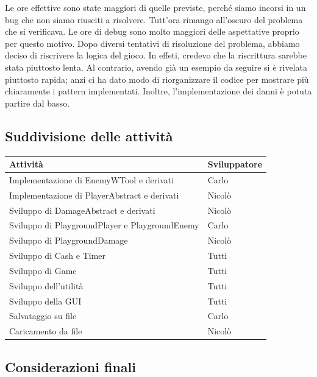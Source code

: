 \documentclass[11pt]{article}
\begin{document}
Le ore effettive sono state maggiori di quelle previste, perché siamo incorsi in
un bug che non siamo riusciti a risolvere. Tutt'ora rimango all'oscuro del
problema che si verificava. Le ore di debug sono molto maggiori delle 
aspettative proprio per questo motivo. Dopo diversi tentativi di risoluzione 
del problema,
abbiamo deciso di riscrivere la logica del gioco. In effeti, credevo che la
riscrittura sarebbe stata piuttosto lenta. Al contrario, avendo già un esempio
da seguire si è rivelata piuttosto rapida; anzi ci ha dato modo di riorganizzare
il codice per mostrare più chiaramente i pattern implementati. Inoltre,
l'implementazione dei danni è potuta partire dal basso.

\subsection{Suddivisione delle attività}

\begin{table}[ht]
	\centering
	\begin{tabular}{|l|l|}
		\hline
		\textbf{Attività} & \textbf{Sviluppatore} \\
		\hline
		Implementazione di EnemyWTool e derivati & Carlo \\ \hline
		Implementazione di PlayerAbstract e derivati & Nicolò \\ \hline
		Sviluppo di DamageAbstract e derivati & Nicolò \\ \hline
		Sviluppo di PlaygroundPlayer e PlaygroundEnemy & Carlo \\ \hline
		Sviluppo di PlaygroundDamage & Nicolò \\ \hline
		Sviluppo di Cash e Timer & Tutti \\ \hline
		Sviluppo di Game & Tutti \\ \hline
		Sviluppo dell'utilità & Tutti \\ \hline
		Sviluppo della GUI & Tutti \\ \hline
		Salvataggio su file & Carlo \\ \hline
		Caricamento da file & Nicolò \\ \hline
	\end{tabular}
\end{table}

\subsection{Considerazioni finali}
\end{document}
